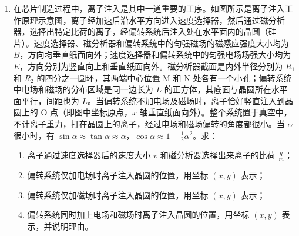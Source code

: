 \documentclass[\gkver]{gaokaozhenti}
\begin{document}
\begin{enumerate}
\item
在芯片制造过程中，离子注入是其中一道重要的工序。如图所示是离子注入工作原理示意图，离子经加速后沿水平方向进入速度选择器，然后通过磁分析器，选择出特定比荷的离子，经偏转系统后注入处在水平面内的晶圆（硅片）。速度选择器、磁分析器和偏转系统中的匀强磁场的磁感应强度大小均为 $B$，方向均垂直纸面向外；速度选择器和偏转系统中的匀强电场场强大小均为 $E$，方向分别为竖直向上和垂直纸面向外。磁分析器截面是内外半径分别为 $R_{1}$ 和 $R_{2}$ 的四分之一圆环，其两端中心位置 M 和 N 处各有一个小孔；偏转系统中电场和磁场的分布区域是同一边长为 $L$ 的正方体，其底面与晶圆所在水平面平行，间距也为 $L$。当偏转系统不加电场及磁场时，离子恰好竖直注入到晶圆上的 O 点（即图中坐标原点，$x$ 轴垂直纸面向外）。整个系统置于真空中，不计离子重力，打在晶圆上的离子，经过电场和磁场偏转的角度都很小。当 $\alpha$ 很小时，有 $\sin\alpha \approx \tan\alpha \approx \alpha$，$\cos\alpha \approx 1 - \frac{1}{2}\alpha^{2}$。求：

\begin{enumerate}
	\item
	离子通过速度选择器后的速度大小 $v$ 和磁分析器选择出来离子的比荷 $\frac{q}{m}$；
	\item
	偏转系统仅加电场时离子注入晶圆的位置，用坐标 $(x, y)$ 表示；
	\item
	偏转系统仅加磁场时离子注入晶圆的位置，用坐标 $(x, y)$ 表示；
	\item
	偏转系统同时加上电场和磁场时离子注入晶圆的位置，用坐标 $(x, y)$ 表示，并说明理由。
\end{enumerate}


\end{enumerate}
\end{document}
